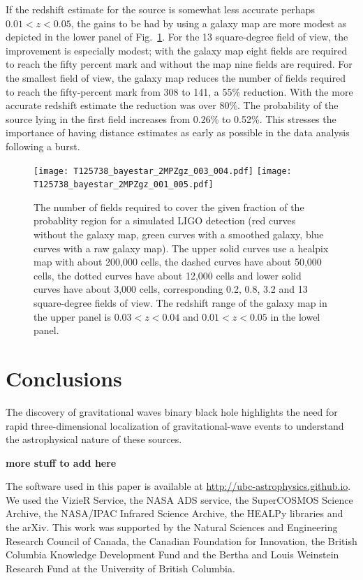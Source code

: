 \documentclass[useAMS,usenatbib]{mn2e}
\begin{document}
If the redshift estimate for the source is somewhat less accurate
perhaps $0.01<z<0.05$, the gains to be had by using a galaxy map are
more modest as depicted in the lower panel of Fig.~\ref{fig:bayestar}.
For the 13 square-degree field of view, the improvement is especially
modest; with the galaxy map eight fields are required to reach the
fifty percent mark and without the map nine fields are required.  For
the smallest field of view, the galaxy map reduces the number of
fields required to reach the fifty-percent mark from 308 to 141, a
55\% reduction.  With the more accurate redshift estimate the
reduction was over 80\%.  The probability of the source lying in the
first field increases from 0.26\% to 0.52\%.  This stresses the
importance of having distance estimates as early as possible in the
data analysis following a burst.
\begin{figure}
  \texttt{[image: T125738\_bayestar\_2MPZgz\_003\_004.pdf]}
  \texttt{[image: T125738\_bayestar\_2MPZgz\_001\_005.pdf]}
  \caption{The number of fields required to cover the given fraction
    of the probablity region for a simulated LIGO detection (red
    curves without the galaxy map, green curves with a smoothed
    galaxy, blue curves with a raw galaxy map).  The upper solid
    curves use a healpix map with about 200,000 cells, the dashed
    curves have about 50,000 cells, the dotted curves have about
    12,000 cells and lower solid curves have about 3,000 cells,
    corresponding 0.2, 0.8, 3.2 and 13 square-degree fields of
    view. The redshift range of the galaxy map in the upper panel is
    $0.03<z<0.04$ and $0.01<z<0.05$ in the lowel panel.}
  \label{fig:bayestar}
\end{figure}

\section{Conclusions}

The discovery of gravitational waves binary black hole highlights the
need for rapid three-dimensional localization of gravitational-wave
events to understand the astrophysical nature of these sources.

{\bf  more stuff to add here}

The software used in this paper is available at
\url{http://ubc-astrophysics.github.io}.  We used the VizieR Service,
the NASA ADS service, the SuperCOSMOS Science Archive, the NASA/IPAC
Infrared Science Archive, the HEALPy libraries and the arXiv. This work
was supported by the Natural Sciences and Engineering Research Council
of Canada, the Canadian Foundation for Innovation, the British
Columbia Knowledge Development Fund and the Bertha and Louis Weinstein
Research Fund at the University of British Columbia.






\label{lastpage}
\end{document}
